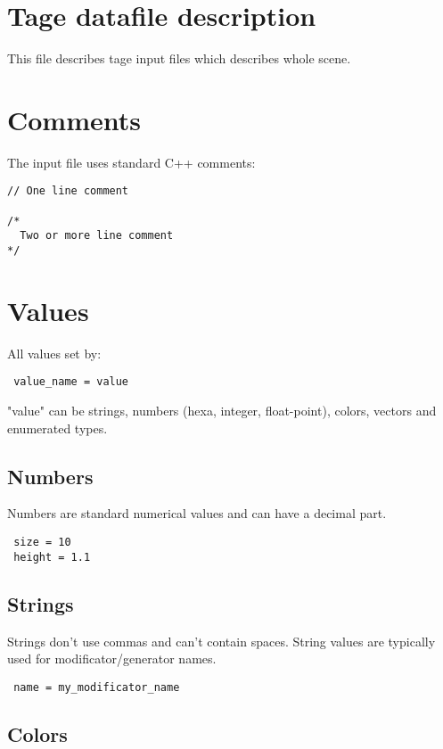 \documentclass[11pt]{article}
\begin{document}
\section{Tage datafile description}

This file describes tage input files which describes whole scene.

\section{Comments}

The input file uses standard C++ comments:

\begin{verbatim}
// One line comment

/*
  Two or more line comment
*/
\end{verbatim}

\section{Values}

All values set by:

\begin{verbatim}
 value_name = value
\end{verbatim}

"value" can be strings, numbers (hexa, integer, float-point), colors, vectors
and enumerated types.

\subsection{Numbers}

Numbers are standard numerical values and can have a decimal part.

\begin{verbatim}
 size = 10
 height = 1.1
\end{verbatim}

\subsection{Strings}

Strings don't use commas and can't contain spaces. String values are typically 
used for modificator/generator names.

\begin{verbatim}
 name = my_modificator_name
\end{verbatim}

\subsection{Colors}
\end{document}
